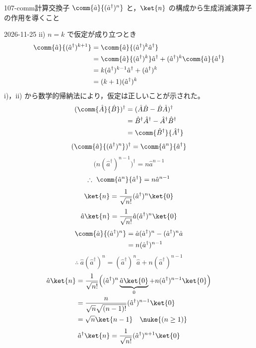 \documentclass[uplatex,dvipdfmx,a4paper,11pt]{jsarticle}
\begin{document}
\begin{mondai}{107-comm}{計算}{交換子 $\comm{\hat{a}}{(\hat{a}^{\dagger})^{n}}$ と，$\ket{n}$ の構成から生成消滅演算子の作用を導くこと}
\begin{kotaeutsushi}{2026-11-25}
ii) $n=k$ で仮定が成り立つとき
\begin{align*}
\comm{\hat{a}}{(\hat{a}^{\dagger})^{k+1}}&=\comm{\hat{a}}{(\hat{a}^{\dagger})^{k}\hat{a}^{\dagger}}\\
&=\comm{\hat{a}}{(\hat{a}^{\dagger})^{k}}\hat{a}^{\dagger}+(\hat{a}^{\dagger})^{k}\comm{\hat{a}}{\hat{a}^{\dagger}}\\
&=k(\hat{a}^{\dagger})^{k-1}\hat{a}^{\dagger}+(\hat{a}^{\dagger})^{k}\\
&=(k+1)(\hat{a}^{\dagger})^{k}
\end{align*}
i)，ii) から数学的帰納法により，仮定は正しいことが示された。
\begin{align*}
(\comm{\hat{A}}{\hat{B}})^{\dagger}&=(\hat{A}\hat{B}-\hat{B}\hat{A})^{\dagger}\\
&=\hat{B}^{\dagger}\hat{A}^{\dagger}-\hat{A}^{\dagger}\hat{B}^{\dagger}\\
&=\comm{\hat{B}^{\dagger}}{\hat{A}^{\dagger}}
\end{align*}
\[ (\comm{\hat{a}}{(\hat{a}^{\dagger})^{n}})^{\dagger}=\comm{\hat{a}^{n}}{\hat{a}^{\dagger}} \]
\[ \bigl(n(\hat{a}^{\dagger})^{n-1}\bigr)^{\dagger}=n\hat{a}^{n-1} \]
\[ \therefore\ \comm{\hat{a}^{n}}{\hat{a}^{\dagger}}=n\hat{a}^{n-1} \]
\[ \ket{n}=\frac{1}{\sqrt{n!}}(\hat{a}^{\dagger})^{n}\ket{0} \]
\[ \hat{a}\ket{n}=\frac{1}{\sqrt{n!}}\hat{a}(\hat{a}^{\dagger})^{n}\ket{0} \]
\begin{align*}
\comm{\hat{a}}{(\hat{a}^{\dagger})^{n}}&=\hat{a}(\hat{a}^{\dagger})^{n}-(\hat{a}^{\dagger})^{n}\hat{a}\\
&=n(\hat{a}^{\dagger})^{n-1}
\end{align*}
\[ \therefore\ \hat{a}(\hat{a}^{\dagger})^{n}=(\hat{a}^{\dagger})^{n}\hat{a}+n(\hat{a}^{\dagger})^{n-1} \]
\begin{align*}
\hat{a}\ket{n}&=\frac{1}{\sqrt{n!}}\Bigl((\hat{a}^{\dagger})^{n}\underbrace{\hat{a}\ket{0}}_{0}+n(\hat{a}^{\dagger})^{n-1}\ket{0}\Bigr)\\
&=\frac{n}{\sqrt{n}\sqrt{(n-1)!}}(\hat{a}^{\dagger})^{n-1}\ket{0}\\
&=\sqrt{n}\ket{n-1}\quad\nuke{(n\ge1)}
\end{align*}
\begin{align*}
\hat{a}^{\dagger}\ket{n}&=\frac{1}{\sqrt{n!}}(\hat{a}^{\dagger})^{n+1}\ket{0}\\

\end{align*}
\end{kotaeutsushi}
\end{mondai}
\end{document}
